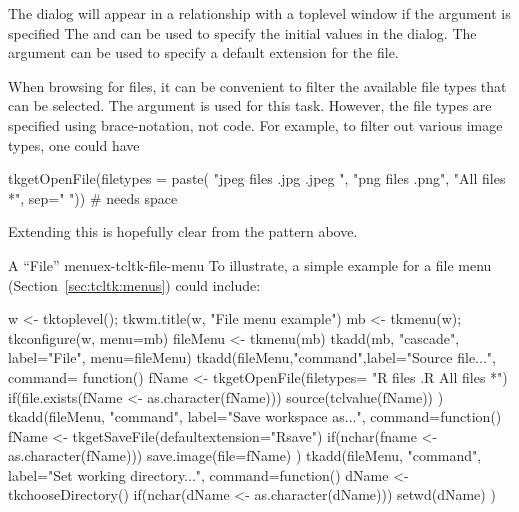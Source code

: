 The dialog will appear in a relationship with a toplevel window if the argument
 is specified The
 and
 can be used to specify the
initial values in the dialog.  The
 argument can be used to
specify a default extension for the file.

When browsing for files, it can be convenient to filter the available
file types that can be selected. The  argument is used for this task. However,
the file types are specified using \TCL\/ brace-notation, not \R\/ code. For example,
to filter out various image types, one could have 
\begin{Schunk}
\begin{Sinput}
 tkgetOpenFile(filetypes = paste(
                 "{{jpeg files} {.jpg .jpeg} }",
                 "{{png files} {.png}}",
                 "{{All files} {*}}", sep=" ")) # needs space
\end{Sinput}
\end{Schunk}
Extending this is hopefully clear from the pattern above.

\begin{example}{A ``File'' menu}{ex-tcltk-file-menu}
  To illustrate, a simple example for a file menu (Section~\ref{sec:tcltk:menus}) could include:
\begin{Schunk}
\begin{Sinput}
 w <- tktoplevel(); tkwm.title(w, "File menu example")
 mb <- tkmenu(w); tkconfigure(w, menu=mb)
 fileMenu <- tkmenu(mb)
 tkadd(mb, "cascade", label="File", menu=fileMenu)
 tkadd(fileMenu,"command",label="Source file...",
       command= function() {
         fName <- tkgetOpenFile(filetypes=
                         "{{R files} {.R}} {{All files} *}")
         if(file.exists(fName <- as.character(fName)))
            source(tclvalue(fName))
       })
 tkadd(fileMenu, "command", label="Save workspace as...",
       command=function() {
         fName <- tkgetSaveFile(defaultextension="Rsave")
         if(nchar(fname <- as.character(fName)))
           save.image(file=fName)
       })
 tkadd(fileMenu, "command", label="Set working directory...",
       command=function() {
         dName <- tkchooseDirectory()
         if(nchar(dName <- as.character(dName)))
           setwd(dName)
       })
\end{Sinput}
\end{Schunk}
\end{example}

